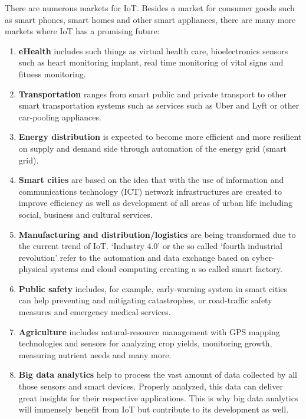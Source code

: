 		There are numerous markets for IoT. Besides a market for consumer goods such as smart phones, smart homes and other smart appliances, there are many more markets where IoT has a promising future:

		\begin{enumerate}
			\item \textbf{eHealth} includes such things as virtual health care, bioelectronics sensors such as heart monitoring implant, real time monitoring of vital signs and fitness monitoring. 

			\item \textbf{Transportation} ranges from smart public and private transport to other smart transportation systems such as services such as Uber and Lyft or other car-pooling appliances. 

			\item \textbf{Energy distribution} is expected to become more efficient and more resilient on supply and demand side through automation of the energy grid (smart grid).

			\item \textbf{Smart cities} are based on the idea that with the use of information and communications technology (ICT) network infrastructures are created to improve efficiency as well as development of all areas of urban life including social, business and cultural services.

			\item \textbf{Manufacturing and distribution/logistics} are being transformed due to the current trend of IoT. `Industry 4.0' or the so called `fourth industrial revolution' refer to the automation and data exchange based on cyber-physical systems and cloud computing creating a so called smart factory.

			\item \textbf{Public safety} includes, for example, early-warning system in smart cities can help preventing and mitigating catastrophes, or road-traffic safety measures and emergency medical services.

			\item \textbf{Agriculture} includes natural-resource management with GPS mapping technologies and sensors for analyzing crop yields, monitoring growth, measuring nutrient needs and many more. 

			\item \textbf{Big data analytics} help to process the vast amount of data collected by all those sensors and smart devices. Properly analyzed, this data can deliver great insights for their respective applications. This is why big data analytics will immensely benefit from IoT but contribute to its development as well.
		\end{enumerate}
		
